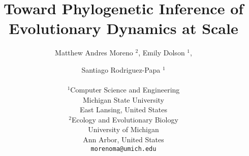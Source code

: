 \title{ Toward Phylogenetic Inference of Evolutionary Dynamics at Scale }

\author{
Matthew Andres Moreno
$^{2}$,
Emily Dolson
$^{1}$,
\and Santiago Rodriguez-Papa
$^{1}$ \\
\mbox{}\\
$^1$Computer Science and Engineering \\
Michigan State University \\
East Lansing, United States \\
$^2$Ecology and Evolutionary Biology \\
University of Michigan \\
Ann Arbor, United States \\
\texttt{morenoma@umich.edu}
}

\maketitle
